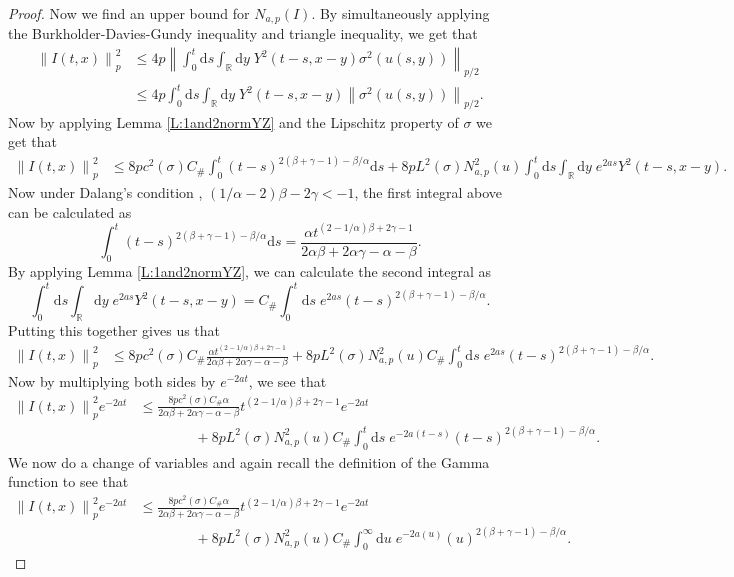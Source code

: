 \documentclass[a4paper,11pt]{article}
\numberwithin{equation}{section}
\theoremstyle{plain}
\theoremstyle{definition}
\newcommand{\ud}{\ensuremath{\mathrm{d} }}
\newcommand{\Norm}[1]{\left\|  #1   \right\|}
\newcommand{\R}{\mathbb{R}}
\numberwithin{NQ}{section}
\numberwithin{LQ}{section}
\numberwithin{ZQ}{section}
\begin{document}
\begin{proof}
Now we find an upper bound for $N_{a,p}(I)$. By simultaneously applying the Burkholder-Davies-Gundy inequality and triangle inequality, we get that  
	\begin{align*}
	\Norm{I(t,x)}_p^2 &\le 4p \Norm{\int_0^t \ud s \int_{\R}\ud y \; Y^2(t-s,x-y)\sigma^2(u(s,y))  }_{p/2}
	\\&\le 4p \int_0^t \ud s \int_{\R} \ud y \; Y^2(t-s,x-y)\Norm{\sigma^2(u(s,y))}_{p/2}.
	\end{align*}
Now by applying Lemma \ref{L:1and2normYZ} and the Lipschitz property of $\sigma$ we get that 
	\begin{align*}
		\Norm{I(t,x)}_p^2 &\le 8pc^2(\sigma)C_{\#}\int_0^t (t-s)^{2(\beta+\gamma-1)-\beta/\alpha} \ud s + 8pL^2(\sigma)N^2_{a,p}(u)\int_0^t \ud s \int_{\R} \ud y \; e^{2as} Y^2(t-s,x-y).
	\end{align*} 
Now under Dalang's condition \cite{CHN19}, $(1/\alpha -2)\beta-2\gamma < -1$, the first integral above can be calculated as 
	\[
		\int_0^t (t-s)^{2(\beta+\gamma-1)-\beta/\alpha} \ud s = \frac{\alpha t^{(2-1/\alpha)\beta + 2\gamma -1} }{2\alpha\beta + 2\alpha \gamma - \alpha - \beta}.
	\]
By applying Lemma \ref{L:1and2normYZ}, we can calculate the second integral as 
	\[
		\int_0^t \ud s \int_{\R} \ud y \; e^{2as} Y^2(t-s,x-y) = C_{\#}\int_0^t \ud s \; e^{2as}(t-s)^{2(\beta+\gamma-1)-\beta/\alpha}.
	\]
Putting this together gives us that 
	\begin{align*}
	\Norm{I(t,x)}_p^2 &\le 8pc^2(\sigma)C_{\#}\frac{\alpha t^{(2-1/\alpha)\beta + 2\gamma -1} }{2\alpha\beta + 2\alpha \gamma - \alpha - \beta} + 8pL^2(\sigma)N^2_{a,p}(u) C_{\#}\int_0^t \ud s \; e^{2as}(t-s)^{2(\beta+\gamma-1)-\beta/\alpha}.
	\end{align*}
Now by multiplying both sides by $e^{-2at}$, we see that
	\begin{align*}
	\Norm{I(t,x)}_p^2e^{-2at} &\le \frac{8pc^2(\sigma)C_{\#} \alpha }{2\alpha\beta + 2\alpha \gamma - \alpha - \beta} t^{(2-1/\alpha)\beta + 2\gamma -1} e^{-2at} 
	\\&\quad\quad\quad\quad+ 8pL^2(\sigma)N^2_{a,p}(u) C_{\#} \int_0^t \ud s \; e^{-2a(t-s)}(t-s)^{2(\beta+\gamma-1)-\beta/\alpha}.
	\end{align*}
We now do a change of variables and again recall the definition of the Gamma function to see that 
	\begin{align*}
	\Norm{I(t,x)}_p^2e^{-2at}  &\le \frac{8pc^2(\sigma)C_{\#} \alpha }{2\alpha\beta + 2\alpha \gamma - \alpha - \beta} t^{(2-1/\alpha)\beta + 2\gamma -1} e^{-2at}
	\\&\quad\quad\quad\quad+ 8pL^2(\sigma)N^2_{a,p}(u) C_{\#} \int_0^\infty \ud u \; e^{-2a(u)}(u)^{2(\beta+\gamma-1)-\beta/\alpha}.

\end{align*}
\end{proof}
\end{document}
